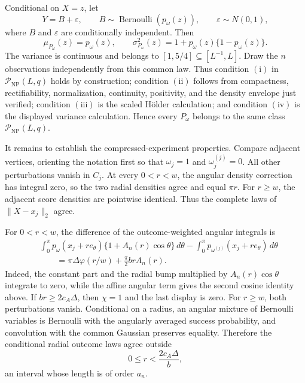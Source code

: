 Conditional on \(X=z\), let
\[
 Y=B+\varepsilon,
 \qquad
 B\sim\operatorname{Bernoulli}(p_\omega(z)),
 \qquad
 \varepsilon\sim N(0,1),
\]
where \(B\) and \(\varepsilon\) are conditionally independent.  Then
\[
 \mu_{P_\omega}(z)=p_\omega(z),
 \qquad
 \sigma_{P_\omega}^2(z)=1+p_\omega(z)\{1-p_\omega(z)\}.
\]
The variance is continuous and belongs to \([1,5/4]\subseteq[L^{-1},L]\).  Draw the \(n\) observations independently from this common law.  Thus condition \(\mathrm{(i)}\) in \(\mathcal P_{\mathrm{NP}}(L,q)\) holds by construction; condition \(\mathrm{(ii)}\) follows from compactness, rectifiability, normalization, continuity, positivity, and the density envelope just verified; condition \(\mathrm{(iii)}\) is the scaled H\"older calculation; and condition \(\mathrm{(iv)}\) is the displayed variance calculation.  Hence every \(P_\omega\) belongs to the same class \(\mathcal P_{\mathrm{NP}}(L,q)\).

It remains to establish the compressed-experiment properties.  Compare adjacent vertices, orienting the notation first so that \(\omega_j=1\) and \(\omega_j^{(j)}=0\).  All other perturbations vanish in \(C_j\).  At every \(0<r<w\), the angular density correction has integral zero, so the two radial densities agree and equal \(\pi r\).  For \(r\geq w\), the adjacent score densities are pointwise identical.  Thus the complete laws of \(\lVert X-x_j\rVert_2\) agree.

For \(0<r<w\), the difference of the outcome-weighted angular integrals is
\[
\begin{aligned}
 &\int_0^\pi p_\omega(x_j+re_\theta)
 \{1+A_n(r)\cos\theta\}\,d\theta
 -\int_0^\pi p_{\omega^{(j)}}(x_j+re_\theta)\,d\theta\\
 &\qquad=\pi\Delta\varphi(r/w)+\frac\pi2brA_n(r).
\end{aligned}
\]
Indeed, the constant part and the radial bump multiplied by \(A_n(r)\cos\theta\) integrate to zero, while the affine angular term gives the second cosine identity above.  If \(br\geq2c_A\Delta\), then \(\chi=1\) and the last display is zero.  For \(r\geq w\), both perturbations vanish.  Conditional on a radius, an angular mixture of Bernoulli variables is Bernoulli with the angularly averaged success probability, and convolution with the common Gaussian preserves equality.  Therefore the conditional radial outcome laws agree outside
\[
 0\leq r<\frac{2c_A\Delta}{b},
\]
an interval whose length is of order \(a_n\).

